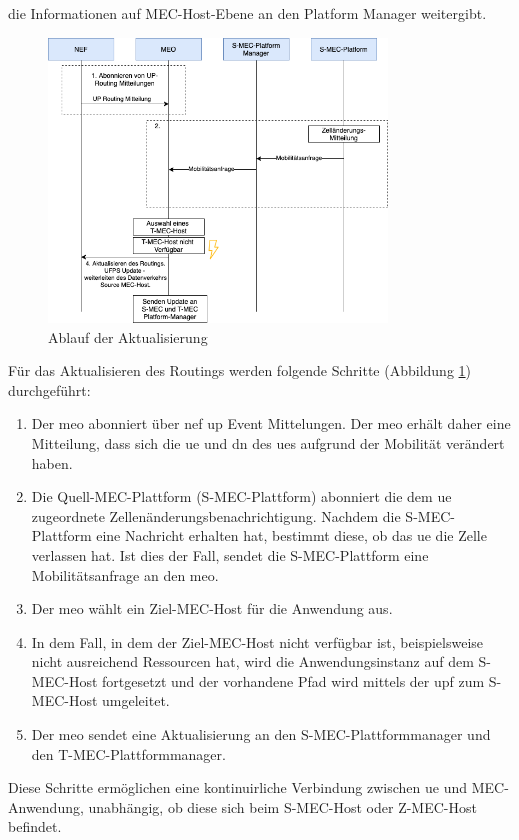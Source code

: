 \documentclass[runningheads]{llncs}
\numberwithin{figure}{section}
\begin{document}
die Informationen auf MEC-Host-Ebene an den Platform Manager weitergibt. \cite{etsiMultiaccessEdgeComputinga}  \cite{balasubramanianMobilityManagementArchitecture2019}
\begin{figure}
  \centering
  \includegraphics[width=9cm]{images/Datenverkehr_Ablauf.png}
  \caption{Ablauf der Aktualisierung}
  \label{fig:Datenverkehr_Ablauf}
\end{figure}
Für das Aktualisieren des Routings werden folgende Schritte (Abbildung \ref{fig:Datenverkehr_Ablauf}) durchgeführt:
\begin{enumerate}
  \item Der \acrfull{meo} abonniert über \acrshort{nef} \acrshort{up} Event Mittelungen. 
  Der \acrshort{meo} erhält daher eine Mitteilung, dass sich die \acrshort{ue} und \acrshort{dn} des
  \acrshort{ue}s aufgrund der Mobilität verändert haben.
  \item Die Quell-MEC-Plattform (S-MEC-Plattform) abonniert die dem \acrshort{ue} zugeordnete Zellenänderungsbenachrichtigung. 
  Nachdem die S-MEC-Plattform eine Nachricht erhalten hat, bestimmt diese, ob das \acrshort{ue} die Zelle verlassen hat. 
  Ist dies der Fall, sendet die S-MEC-Plattform eine Mobilitätsanfrage an den \acrshort{meo}.
  \item Der \acrshort{meo} wählt ein Ziel-MEC-Host für die Anwendung aus.
  \item In dem Fall, in dem der Ziel-MEC-Host nicht verfügbar ist, beispielsweise nicht ausreichend Ressourcen hat,
  wird die Anwendungsinstanz auf dem S-MEC-Host fortgesetzt und der vorhandene Pfad wird mittels der \acrshort{upf} zum S-MEC-Host umgeleitet.
  \item Der \acrshort{meo} sendet eine Aktualisierung an den S-MEC-Plattformmanager und den T-MEC-Plattformmanager.
\end{enumerate}
Diese Schritte ermöglichen eine kontinuirliche Verbindung zwischen \acrshort{ue} und MEC-Anwendung, unabhängig, ob diese sich beim S-MEC-Host oder Z-MEC-Host befindet.
\newpage
\end{document}
